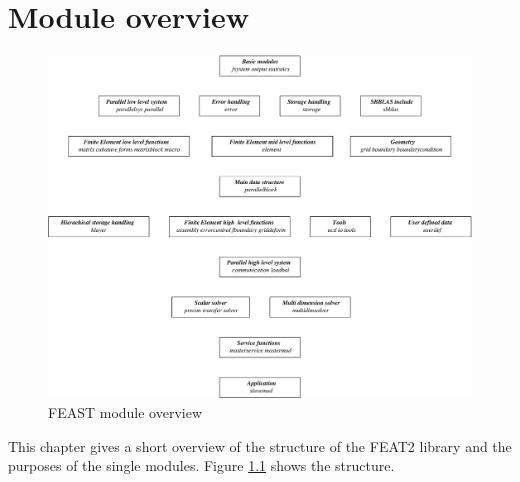 \chapter{Module overview}

\newpage

\begin{figure}[!h]
\begin{center}
\includegraphics[scale=0.675]{../psfiles/modoverview.eps}
\end{center}
\caption{FEAST module overview}
\label{modoverview}
\end{figure}

This chapter gives a short overview of the structure of the
FEAT2 library and the purposes of the single modules. Figure \ref{modoverview}
shows the structure.

